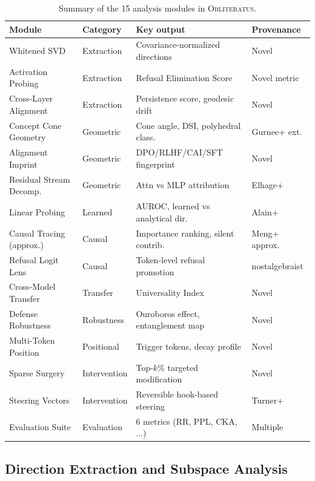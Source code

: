 \documentclass[11pt]{article}
\begin{document}
\begin{table}[t]
\centering
\caption{Summary of the 15 analysis modules in \textsc{Obliteratus}.}
\label{tab:modules}
\small
\begin{tabular}{@{}llll@{}}
\toprule
\textbf{Module} & \textbf{Category} & \textbf{Key output} & \textbf{Provenance} \\
\midrule
Whitened SVD & Extraction & Covariance-normalized directions & Novel \\
Activation Probing & Extraction & Refusal Elimination Score & Novel metric \\
Cross-Layer Alignment & Extraction & Persistence score, geodesic drift & Novel \\
\midrule
Concept Cone Geometry & Geometric & Cone angle, DSI, polyhedral class. & Gurnee+ ext. \\
Alignment Imprint & Geometric & DPO/RLHF/CAI/SFT fingerprint & Novel \\
Residual Stream Decomp. & Geometric & Attn vs MLP attribution & Elhage+ \\
\midrule
Linear Probing & Learned & AUROC, learned vs analytical dir. & Alain+ \\
Causal Tracing (approx.) & Causal & Importance ranking, silent contrib. & Meng+ approx. \\
Refusal Logit Lens & Causal & Token-level refusal promotion & nostalgebraist \\
\midrule
Cross-Model Transfer & Transfer & Universality Index & Novel \\
Defense Robustness & Robustness & Ouroboros effect, entanglement map & Novel \\
Multi-Token Position & Positional & Trigger tokens, decay profile & Novel \\
\midrule
Sparse Surgery & Intervention & Top-$k$\% targeted modification & Novel \\
Steering Vectors & Intervention & Reversible hook-based steering & Turner+ \\
\midrule
Evaluation Suite & Evaluation & 6 metrics (RR, PPL, CKA, ...) & Multiple \\
\bottomrule
\end{tabular}
\end{table}

\subsection{Direction Extraction and Subspace Analysis}
\end{document}
